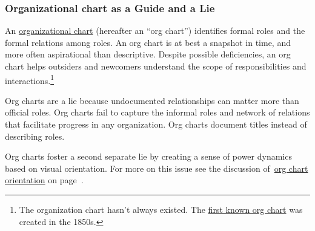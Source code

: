 \subsubsection*{Organizational chart as a Guide and a Lie\label{sec:org-chart-as-guide-and-lie}}

An \href{https://en.wikipedia.org/wiki/Organizational_chart}{organizational chart} 
(hereafter an ``\gls{org chart}'') identifies formal roles and the formal relations among roles. An org chart is at best a snapshot in time, and more often aspirational than descriptive. Despite possible deficiencies, an org chart helps outsiders and newcomers understand the scope of responsibilities and interactions.\footnote{The organization chart hasn't always existed. The \href{https://en.wikipedia.org/wiki/George_Holt_Henshaw\#First_organization_chart}{first known org chart} 
was created in the 1850s.}

Org charts are a lie because undocumented relationships can matter more than official roles. Org charts fail to capture the informal roles and network of relations that facilitate progress in any organization. Org charts document titles instead of describing roles.

Org charts foster a second separate lie by creating a sense of power dynamics based on visual orientation. For more on this issue see the discussion of~\hyperref[sec:org-chart-orientation]{org chart orientation} on page~\pageref{sec:org-chart-orientation}.
